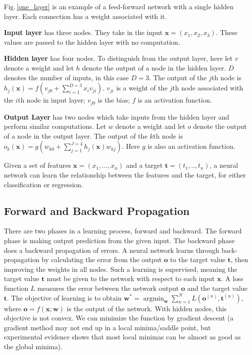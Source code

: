 Fig.\,\ref{one_layer} is an example of a feed-forward network with a single hidden layer. Each connection has a weight associated with it.

\textbf{Input layer} has three nodes. They take in the input $\mathbf{x} = (x_1,x_2,x_3)$. These values are passed to the hidden layer with no computation.

\textbf{Hidden layer} has four nodes. To distinguish from the output layer, here let $v$ denote a weight and let $h$ denote the output of a node in the hidden layer. $D$ denotes the number of inputs, in this case $D=3$. The output of the $j$th node is $h_j(\mathbf{x}) = f(v_{j0}+\sum_{i=1}^{D=3} x_iv_{ji})$. $v_{ji}$ is a weight of the $j$th node associated with the $i$th node in input layer; $v_{j0}$ is the bias; $f$ is an activation function.

\textbf{Output Layer} has two nodes which take inputs from the hidden layer and perform similar computations.
Let $w$ denote a weight and let $o$ denote the output of a node in the output layer. The output of the $k$th node is $o_k(\mathbf{x}) = g(w_{k0}+\sum_{j=1}^{J=4} h_j(\mathbf{x}) w_{kj})$. Here $g$ is also an activation function.

Given a set of features $\mathbf{x} = (x_1,...,x_n)$ and a target $\mathbf{t} = (t_1,..,t_n)$, a neural network can learn the relationship between the features and the target, for either classification or regression.

\newcommand{\argminE}{\mathop{\mathrm{argmin}}}  

\subsection{Forward and Backward Propagation}
\label{back-prob}
There are two phases in a learning process, forward and backward. The forward phase is making output prediction from the given input. The backward phase does a backward propagation of errors. A neural network learns through back-propagation by calculating the error from the output $\mathbf{o}$ to the target value $\mathbf{t}$, then improving the weights in all nodes. Such a learning is supervised, meaning the target value $\mathbf{t}$ must be given to the network with respect to each input $\mathbf{x}$. A loss function $L$ measures the error between the network output $\mathbf{o}$ and the target value $\mathbf{t}$. The objective of learning is to obtain $\mathbf{w}^* = \argminE_\mathbf{w} \sum_{n=1}^N L(\mathbf{o}^{(n)},\mathbf{t}^{(n)})$, where $\mathbf{o} = f(\mathbf{x};\mathbf{w})$ is the output of the network. With hidden nodes, this objective is not convex. We can minimize the function by gradient descent (a gradient method may not end up in a local minima/saddle point, but experimental evidence shows that most local minimas can be almost as good as the global minima).

